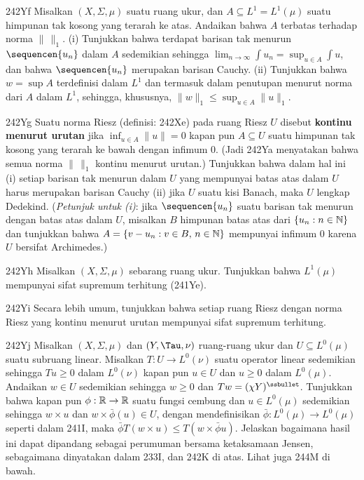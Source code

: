 {\spheader 242Yf Misalkan $(X,\Sigma,\mu)$ suatu ruang ukur, dan
$A\subseteq L^1=L^1(\mu)$ suatu himpunan tak kosong yang terarah ke atas.
Andaikan bahwa $A$ terbatas terhadap norma $\|\,\|_1$. (i) Tunjukkan
bahwa terdapat barisan tak menurun $\sequencen{u_n}$ dalam $A$ sedemikian
sehingga $\lim_{n\to\infty}\int u_n=\sup_{u\in A}\int u$, dan bahwa
$\sequencen{u_n}$ merupakan barisan Cauchy. (ii) Tunjukkan bahwa
$w=\sup A$ terdefinisi dalam $L^1$ dan termasuk dalam penutupan menurut
norma dari $A$ dalam $L^1$, sehingga, khususnya,
$\|w\|_1\le\sup_{u\in A}\|u\|_1$.

\spheader 242Yg Suatu norma Riesz (definisi: 242Xe) pada ruang Riesz
$U$ disebut {\bf kontinu menurut urutan} jika
$\inf_{u\in A}\|u\|=0$ kapan pun $A\subseteq U$ suatu himpunan tak
kosong yang terarah ke bawah dengan infimum $0$. (Jadi 242Ya menyatakan
bahwa semua norma $\|\,\|_1$ kontinu menurut urutan.) Tunjukkan bahwa
dalam hal ini (i) setiap barisan tak menurun dalam $U$ yang mempunyai batas
atas dalam $U$ harus merupakan barisan Cauchy (ii) jika $U$ suatu kisi
Banach, maka $U$ lengkap Dedekind. ({\it Petunjuk untuk (i)\/}: jika
$\sequencen{u_n}$ suatu barisan tak menurun dengan batas atas dalam $U$,
misalkan $B$ himpunan batas atas dari $\{u_n:n\in\Bbb N\}$ dan tunjukkan
bahwa $A=\{v-u_n:v\in B,\,n\in\Bbb N\}$ mempunyai infimum $0$ karena
$U$ bersifat Archimedes.)

\spheader 242Yh Misalkan $(X,\Sigma,\mu)$ sebarang ruang ukur.
Tunjukkan bahwa $L^1(\mu)$ mempunyai sifat supremum terhitung (241Ye).

\spheader 242Yi Secara lebih umum, tunjukkan bahwa setiap ruang Riesz
dengan norma Riesz yang kontinu menurut urutan mempunyai sifat supremum
terhitung.

\spheader 242Yj Misalkan $(X,\Sigma,\mu)$ dan $(Y,\Tau,\nu)$
ruang-ruang ukur dan $U\subseteq L^0(\mu)$ suatu subruang linear.
Misalkan $T:U\to L^0(\nu)$ suatu operator linear sedemikian sehingga
$Tu\ge 0$ dalam $L^0(\nu)$ kapan pun $u\in U$ dan $u\ge 0$ dalam
$L^0(\mu)$. Andaikan $w\in U$ sedemikian sehingga $w\ge 0$ dan
$Tw=(\chi Y)^{\ssbullet}$. Tunjukkan bahwa kapan pun
$\phi:\Bbb R\to\Bbb R$ suatu fungsi cembung dan $u\in L^0(\mu)$
sedemikian sehingga $w\times u$ dan $w\times\bar\phi(u)\in U$, dengan
mendefinisikan $\bar\phi:L^0(\mu)\to L^0(\mu)$ seperti dalam 241I,
maka $\bar\phi T(w\times u)\le T(w\times\bar\phi u)$. Jelaskan bagaimana
hasil ini dapat dipandang sebagai perumuman bersama ketaksamaan Jensen,
sebagaimana dinyatakan dalam 233I, dan 242K di atas. Lihat juga 244M di
bawah.

}
